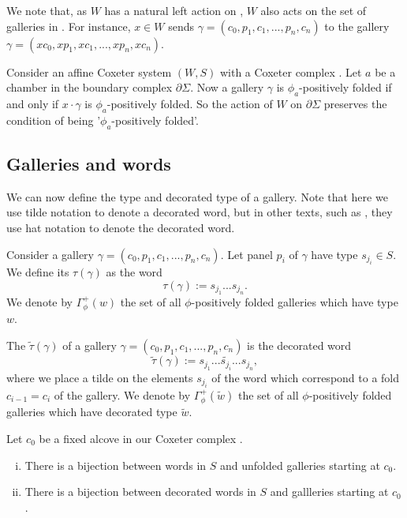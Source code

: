 \documentclass[11pt]{article}
\begin{document}
We note that, as $W$ has a natural left action on \sg, $W$ also acts on the set of galleries in \sg. For instance, $x\in W$ sends $\gamma = (c_0,p_1,c_1,...,p_n,c_n)$ to the gallery $\gamma = (xc_0,xp_1,xc_1,...,xp_n,xc_n)$. 

\begin{lemma} 
    Consider an affine Coxeter system $(W,S)$ with a Coxeter complex \sg. Let $a$ be a chamber in the boundary complex $\partial\Sigma$. Now a gallery $\gamma$ is $\phi_a$-positively folded if and only if $x\cdot \gamma$ is $\phi_a$-positively folded. So the action of $W$ on $\partial\Sigma$ preserves the condition of being '$\phi_a$-positively folded'.
\end{lemma}

\subsection{Galleries and words}

We can now define the type and decorated type of a gallery. Note that here we use tilde notation to denote a decorated word, but in other texts, such as \cite{SHA}, they use hat notation to denote the decorated word.

\begin{definition}
    Consider a gallery $\gamma = (c_0,p_1,c_1,...,p_n,c_n)$. Let panel $p_i$ of $\gamma$ have type $s_{j_i}\in S$. We define its  $\tau(\gamma)$ as the word 
    \[\tau(\gamma):=s_{j_1}...s_{j_n}.\]
    We denote by $\Gamma_{\phi}^+(w)$ the set of all $\phi$-positively folded galleries which have type $w$. 
\end{definition}

\begin{definition}
    The  $\tilde\tau(\gamma)$ of a gallery $\gamma = (c_0,p_1,c_1,...,p_n,c_n)$ is the decorated word
    \[\tilde\tau(\gamma):= s_{j_1}...\tilde{s_{j_i}}...s_{j_n},\]
    where we place a tilde on the elements $s_{j_i}$ of the word which correspond to a fold $c_{i-1}=c_i$ of the gallery. We denote by $\Gamma_{\phi}^+(\tilde{w})$ the set of all $\phi$-positively folded galleries which have decorated type $\tilde{w}$.
\end{definition}


\begin{lemma}\cite[p.128]{SHA}
    Let $c_0$ be a fixed alcove in our Coxeter complex \sg. 
    \begin{enumerate}[(i)]
        \item There is a bijection between words in $S$ and unfolded galleries starting at $c_0$.
        \item There is a bijection between decorated words in $S$ and gallleries starting at $c_0$. 
    \end{enumerate}
\end{lemma}
\end{document}
